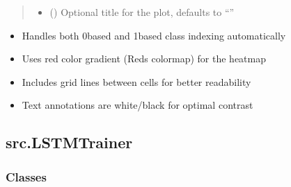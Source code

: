 \documentclass[letterpaper,10pt,english]{sphinxmanual}
\begin{document}
\begin{fulllineitems}
\begin{quote}
\begin{description}
\begin{itemize}
\item {} 
\sphinxAtStartPar
{} (\sphinxstyleliteralemphasis{\sphinxupquote{, }}) \textendash{} Optional title for the plot, defaults to “”

\end{itemize}

\end{description}\end{quote}
\begin{description}
\begin{itemize}
\item {} 
\sphinxAtStartPar
Handles both 0\sphinxhyphen{}based and 1\sphinxhyphen{}based class indexing automatically

\item {} 
\sphinxAtStartPar
Uses red color gradient (Reds colormap) for the heatmap

\item {} 
\sphinxAtStartPar
Includes grid lines between cells for better readability

\item {} 
\sphinxAtStartPar
Text annotations are white/black for optimal contrast

\end{itemize}

\end{description}

\end{fulllineitems}


\sphinxstepscope


\subsection{src.LSTMTrainer}
\label{\detokenize{autoapi/src/LSTMTrainer/index:module-src.LSTMTrainer}}\label{\detokenize{autoapi/src/LSTMTrainer/index:src-lstmtrainer}}\label{\detokenize{autoapi/src/LSTMTrainer/index::doc}}

\subsubsection{Classes}
\label{\detokenize{autoapi/src/LSTMTrainer/index:classes}}
\end{document}
